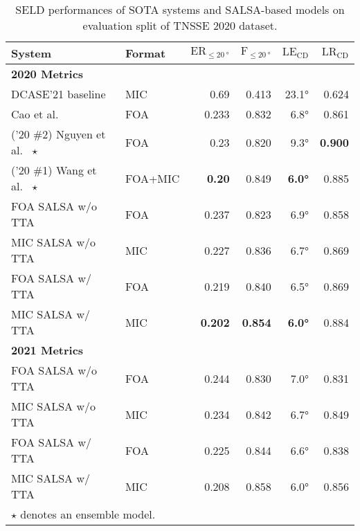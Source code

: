 \documentclass[journal]{IEEEtran}
\newcommand{\etalcite}[1]{ et al.~\cite{#1}}
\begin{document}
\begin{table}[t] \small

    \centering
    \caption{SELD performances of SOTA systems and SALSA-based models on evaluation split of TNSSE 2020 dataset.}
    \setlength{\tabcolsep}{3pt}
    \footnotesize
    \noindent\begin{tabularx}{\columnwidth}{Xlrrrr}
    \toprule 
        System
        & Format
        & $\text{ER}_{\le \SI{20}{\degree}}$ 
        & $\text{F}_{\le \SI{20}{\degree}}$
        & $\text{LE}_\text{CD}$
        & $\text{LR}_\text{CD}$ \\
    \midrule
    \bfseries 2020 Metrics \\
        DCASE'21 baseline~\cite{Politis2020ADetection}
            & MIC & 0.69\hphantom{0} & 0.413 & 23.1\si{\degree} & 0.624 \\
        Cao\etalcite{Cao2021AnDetection}
            & FOA & 0.233 & 0.832 & 6.8\si{\degree} & 0.861 \\
        ('20 \#2) Nguyen\etalcite{Nguyen2020EnsembleTracking} $\star$  
            & FOA & 0.23\hphantom{0} & 0.820 & 9.3\si{\degree} & \bf{0.900} \\
        ('20 \#1) Wang\etalcite{Wang2020TheChallenge} $\star$ 
            & FOA+MIC & \bf{0.20\hphantom{0}} & 0.849 & \bf{6.0\si{\degree}} & 0.885 \\
    \midrule
        FOA SALSA w/o TTA
            & FOA & 0.237 & 0.823 & 6.9\si{\degree} & 0.858 \\
        MIC SALSA w/o TTA
            & MIC & 0.227 & 0.836 & 6.7\si{\degree} & 0.869 \\ 
        FOA SALSA w/ TTA
            & FOA & 0.219 & 0.840 & 6.5\si{\degree} & 0.869 \\
        MIC SALSA w/ TTA
            & MIC & \bf{0.202} & \bf{0.854} & \bf{6.0\si{\degree}} & 0.884 \\
    \midrule
    \midrule
    \bfseries 2021 Metrics \\
        FOA SALSA w/o TTA
            & FOA & 0.244 & 0.830 & 7.0\si{\degree} & 0.831 \\
        MIC SALSA w/o TTA
            & MIC & 0.234 & 0.842 & 6.7\si{\degree} & 0.849 \\ 
        FOA SALSA w/ TTA
            & FOA & 0.225 & 0.844 & 6.6\si{\degree} & 0.838 \\
        MIC SALSA w/ TTA
            & MIC & 0.208 & 0.858 & 6.0\si{\degree} & 0.856 \\
    \bottomrule
    \multicolumn{2}{l}{$\star$ denotes an ensemble model.}
    \end{tabularx}
    \label{tab:sota_2020_eval}
\end{table}
\end{document}
